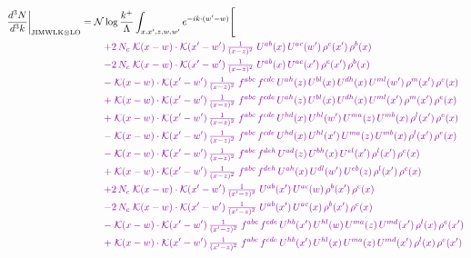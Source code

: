 \documentclass[10pt]{article}
\numberwithin{equation}{section}
\newcommand{\NN}{\mathcal N\log\frac{k^+}{\Lambda}}
\begin{document}
\begin{align}
\frac{d^3N}{d^3k}\bigg|_{{\rm JIMWLK}\otimes{\rm LO}}={}&\NN\int_{x,x',z,w,w'}e^{-ik\cdot(w'-w)}\Bigg[\notag\\
&\quad{\color{CC}+2\,N_c\;\mathcal{K}(x-w)\cdot\mathcal{K}(x'-w')\,\tfrac{1}{(x-z)^{2}}\;U^{ab}(x)\,U^{ac}(w')\,\rho^{c}(x')\,\rho^{b}(x)}\notag\\
&\quad{\color{CC}-2\,N_c\;\mathcal{K}(x-w)\cdot\mathcal{K}(x'-w')\,\tfrac{1}{(x-z)^{2}}\;U^{ab}(x)\,U^{ac}(x')\,\rho^{c}(x')\,\rho^{b}(x)}\notag\\
&\quad{\color{CC}-\;\mathcal{K}(x-w)\cdot\mathcal{K}(x'-w')\,\tfrac{1}{(x-z)^{2}}\;f^{abc}\,f^{cde}\,U^{ah}(z)\,U^{bl}(x)\,U^{dh}(x)\,U^{ml}(w')\,\rho^{m}(x')\,\rho^{e}(x)}\notag\\
&\quad{\color{CC}+\;\mathcal{K}(x-w)\cdot\mathcal{K}(x'-w')\,\tfrac{1}{(x-z)^{2}}\;f^{abc}\,f^{cde}\,U^{ah}(z)\,U^{bl}(x)\,U^{dh}(x)\,U^{ml}(x')\,\rho^{m}(x')\,\rho^{e}(x)}\notag\\
&\quad{\color{CC}+\;\mathcal{K}(x-w)\cdot\mathcal{K}(x'-w')\,\tfrac{1}{(x-z)^{2}}\;f^{abc}\,f^{cde}\,U^{hd}(x)\,U^{hl}(w')\,U^{ma}(z)\,U^{mb}(x)\,\rho^{l}(x')\,\rho^{e}(x)}\notag\\
&\quad{\color{CC}-\;\mathcal{K}(x-w)\cdot\mathcal{K}(x'-w')\,\tfrac{1}{(x-z)^{2}}\;f^{abc}\,f^{cde}\,U^{hd}(x)\,U^{hl}(x')\,U^{ma}(z)\,U^{mb}(x)\,\rho^{l}(x')\,\rho^{e}(x)}\notag\\
&\quad{\color{CC}-\;\mathcal{K}(x-w)\cdot\mathcal{K}(x'-w')\,\tfrac{1}{(x-z)^{2}}\;f^{abc}\,f^{deh}\,U^{ad}(z)\,U^{bh}(x)\,U^{el}(x')\,\rho^{l}(x')\,\rho^{c}(x)}\notag\\
&\quad{\color{CC}+\;\mathcal{K}(x-w)\cdot\mathcal{K}(x'-w')\,\tfrac{1}{(x-z)^{2}}\;f^{abc}\,f^{deh}\,U^{ah}(x)\,U^{dl}(w')\,U^{eb}(z)\,\rho^{l}(x')\,\rho^{c}(x)}\notag\\
&\quad{\color{CC}+2\,N_c\;\mathcal{K}(x-w)\cdot\mathcal{K}(x'-w')\,\tfrac{1}{(x'-z)^{2}}\;U^{ab}(x')\,U^{ac}(w)\,\rho^{b}(x')\,\rho^{c}(x)}\notag\\
&\quad{\color{CC}-2\,N_c\;\mathcal{K}(x-w)\cdot\mathcal{K}(x'-w')\,\tfrac{1}{(x'-z)^{2}}\;U^{ab}(x')\,U^{ac}(x)\,\rho^{b}(x')\,\rho^{c}(x)}\notag\\
&\quad{\color{CC}-\;\mathcal{K}(x-w)\cdot\mathcal{K}(x'-w')\,\tfrac{1}{(x'-z)^{2}}\;f^{abc}\,f^{cde}\,U^{hb}(x')\,U^{hl}(w)\,U^{ma}(z)\,U^{md}(x')\,\rho^{l}(x)\,\rho^{e}(x')}\notag\\
&\quad{\color{CC}+\;\mathcal{K}(x-w)\cdot\mathcal{K}(x'-w')\,\tfrac{1}{(x'-z)^{2}}\;f^{abc}\,f^{cde}\,U^{hb}(x')\,U^{hl}(x)\,U^{ma}(z)\,U^{md}(x')\,\rho^{l}(x)\,\rho^{e}(x')}\notag\\

\end{align}
\end{document}
